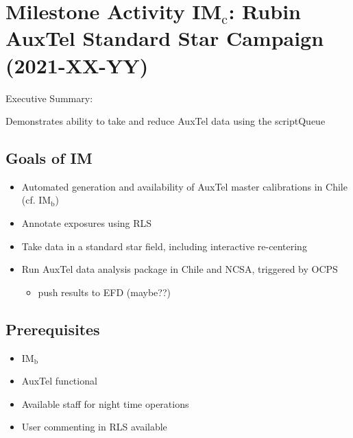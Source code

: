 \section{Milestone Activity IM\(_{\text{c}}\): Rubin AuxTel Standard Star Campaign (2021-XX-YY)}
\label{sec:org0c7ebd6}
Executive Summary:

Demonstrates ability to take and reduce AuxTel data using the scriptQueue

\subsection{Goals of IM}
\label{sec:org8143b85}
\begin{itemize}
\item Automated generation and availability of AuxTel master calibrations in Chile (cf. IM\(_{\text{b}}\))
\item Annotate exposures using RLS
\item Take data in a standard star field, including interactive re-centering
\item Run AuxTel data analysis package in Chile and NCSA, triggered by \gls{OCPS}
\begin{itemize}
\item push results to EFD (maybe??)
\end{itemize}
\end{itemize}

\subsection{Prerequisites}
\begin{itemize}
\item{IM\(_{\text{b}}\)}
\item{AuxTel functional}
\item{Available staff for night time operations}
\item{User commenting in RLS available}
\end{itemize}

